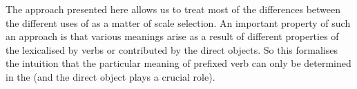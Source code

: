 


The approach presented here allows us to treat most of the differences between the different uses of  as a matter of scale selection. An important property of such an approach is that various meanings arise as a result of different properties of the  lexicalised by verbs or contributed by the direct objects. So this formalises the intuition that the particular meaning of prefixed verb can only be determined in the  (and the direct object plays a crucial role). 

